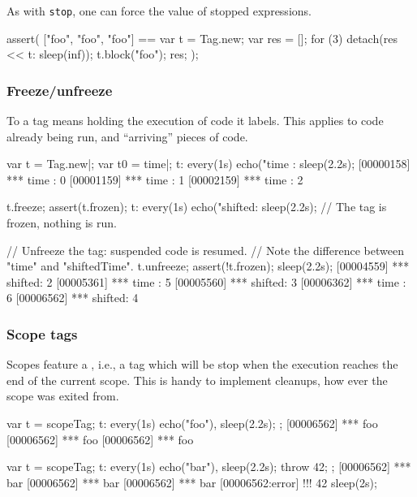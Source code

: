 As with \lstinline|stop|, one can force the value of stopped
expressions.

\begin{urbiscript}
assert(
  ["foo", "foo", "foo"]
  ==
  {
    var t = Tag.new;
    var res = [];
    for (3)
      detach(res << {t: sleep(inf)});
    t.block("foo");
    res;
  });
\end{urbiscript}

\subsubsection{Freeze/unfreeze}
\label{sec:specs:tag:freeze}

To  a tag means holding the execution of code it labels.
This applies to code already being run, and ``arriving'' pieces of code.

\begin{urbiscript}
var t = Tag.new|;
var t0 = time|;
t: every(1s) echo("time   : %
sleep(2.2s);
[00000158] *** time   : 0
[00001159] *** time   : 1
[00002159] *** time   : 2

t.freeze;
assert(t.frozen);
t: every(1s) echo("shifted: %
sleep(2.2s);
// The tag is frozen, nothing is run.

// Unfreeze the tag: suspended code is resumed.
// Note the difference between "time" and "shiftedTime".
t.unfreeze;
assert(!t.frozen);
sleep(2.2s);
[00004559] *** shifted: 2
[00005361] *** time   : 5
[00005560] *** shifted: 3
[00006362] *** time   : 6
[00006562] *** shifted: 4
\end{urbiscript}


\subsubsection{Scope tags}
\label{sec:specs:tag:scope}

Scopes feature a , i.e., a tag which will be stop
when the execution reaches the end of the current scope.  This is
handy to implement cleanups, how ever the scope was exited from.

\begin{urbiscript}
{
  var t = scopeTag;
  t: every(1s)
      echo("foo"),
  sleep(2.2s);
};
[00006562] *** foo
[00006562] *** foo
[00006562] *** foo

{
  var t = scopeTag;
  t: every(1s)
      echo("bar"),
  sleep(2.2s);
  throw 42;
};
[00006562] *** bar
[00006562] *** bar
[00006562] *** bar
[00006562:error] !!! 42
sleep(2s);
\end{urbiscript}

